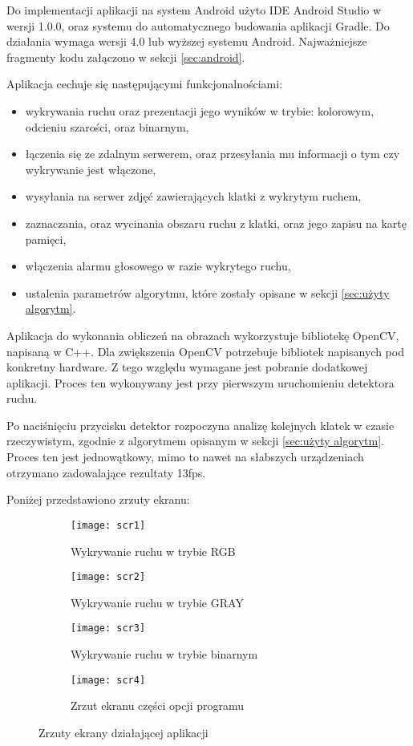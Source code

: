Do implementacji aplikacji na system Android użyto IDE Android Studio w wersji 1.0.0, oraz systemu do automatycznego budowania aplikacji Gradle. Do działania wymaga wersji 4.0 lub wyższej systemu Android. Najważniejsze fragmenty kodu załączono w sekcji \ref{sec:android}. 

Aplikacja cechuje się następującymi funkcjonalnościami: 
\begin{itemize}
	\item wykrywania ruchu oraz prezentacji jego wyników w trybie: kolorowym, odcieniu szarości, oraz binarnym,
	\item łączenia się ze zdalnym serwerem, oraz przesyłania mu informacji o tym czy wykrywanie jest włączone,
	\item wysyłania na serwer zdjęć zawierających klatki z wykrytym ruchem,
	\item zaznaczania, oraz wycinania obszaru ruchu z klatki, oraz jego zapisu na kartę pamięci,
	\item włączenia alarmu głosowego w razie wykrytego ruchu,
	\item ustalenia parametrów algorytmu, które zostały opisane w sekcji \ref{sec:użyty algorytm}.

\end{itemize}

Aplikacja do wykonania obliczeń na obrazach wykorzystuje bibliotekę OpenCV, napisaną w C++. Dla zwiększenia OpenCV potrzebuje bibliotek napisanych pod konkretny hardware. Z tego względu wymagane jest pobranie dodatkowej aplikacji. Proces ten wykonywany jest przy pierwszym uruchomieniu detektora ruchu.

Po naciśnięciu przycisku detektor rozpoczyna analizę kolejnych klatek w czasie rzeczywistym, zgodnie z algorytmem opisanym w sekcji \ref{sec:użyty algorytm}. Proces ten jest jednowątkowy, mimo to nawet na słabszych urządzeniach otrzymano zadowalające rezultaty 13fps. 

Poniżej przedstawiono zrzuty ekranu:

\begin{figure}
\centering
	\begin{subfigure}{.5\textwidth}
	  \centering
	  \texttt{[image: scr1]}
	  \caption{Wykrywanie ruchu w trybie RGB}
	  \label{fig:sub1}
	\end{subfigure}%
	\begin{subfigure}{.5\textwidth}
	  \centering
	  \texttt{[image: scr2]}
	  \caption{Wykrywanie ruchu w trybie GRAY}
	  \label{fig:sub2}
	\end{subfigure}
	
	\begin{subfigure}{.5\textwidth}
	  \centering
	  \texttt{[image: scr3]}
	  \caption{Wykrywanie ruchu w trybie binarnym}
	  \label{fig:scr3}
	\end{subfigure}%
	\begin{subfigure}{.5\textwidth}
	  \centering
	  \texttt{[image: scr4]}
	  \caption{Zrzut ekranu części opcji programu}
	  \label{fig:scr4}
	\end{subfigure}
\caption{Zrzuty ekrany działającej aplikacji}
\label{fig:test}
\end{figure}

